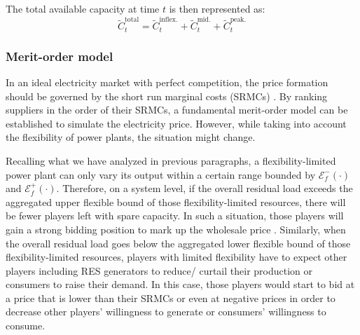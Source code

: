 The total available capacity at time $t$ is then represented as:
\begin{equation}
\label{eq:generation_total}
\tilde{C}_{t}^{\text{total}} = \tilde{C}_{t}^{\text{inflex.}} + \tilde{C}_{t}^{\text{mid.}} +\tilde{C}_{t}^{\text{peak.}}
\end{equation}

\subsubsection{Merit-order model}




In an ideal electricity market with perfect competition, the price formation should be governed by the short run marginal costs (SRMCs) \cite{Ranci2013,Grunewald2012a}. By ranking suppliers in the order of their SRMCs, a fundamental merit-order model can be established to simulate the electricity price. However, while taking into account the flexibility of power plants, the situation might change. 

Recalling what we have analyzed in previous paragraphs, a flexibility-limited power plant can only vary its output within a certain range bounded by $\mathcal{E}_f^-(\cdot)$ and $\mathcal{E}_f^+(\cdot)$. Therefore, on a system level, if the overall residual load exceeds the aggregated upper flexible bound of those flexibility-limited resources, there will be fewer players left with spare capacity. In such a situation, those players will gain a strong bidding position to mark up the wholesale price \cite{Grunewald2012a}. Similarly, when the overall residual load goes below the aggregated lower flexible bound of those flexibility-limited resources, players with limited flexibility have to expect other players including RES generators to reduce/ curtail their production or consumers to raise their demand. In this case, those players would start to bid at a price that is lower than their SRMCs or even at negative prices in order to decrease other players' willingness to generate or consumers' willingness to consume.

